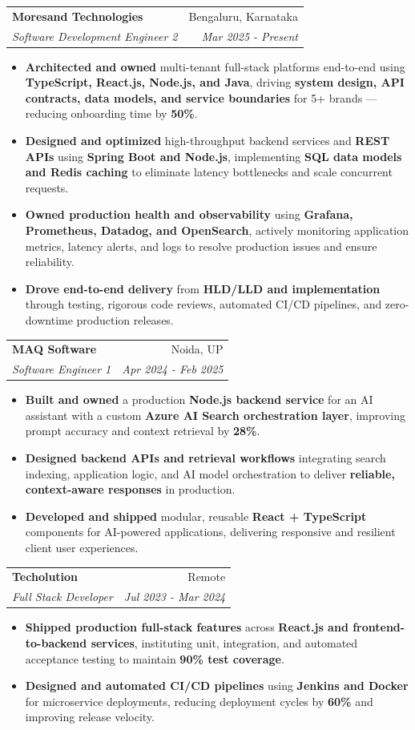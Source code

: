 \documentclass[a4paper,10pt]{article}
\makeatletter
\newcommand{\resumeSubheading}[4]{
  \vspace{-1pt}\item
    \begin{tabular*}{0.97\textwidth}{l@{\extracolsep{\fill}}r}
      \textbf{#1} & #2 \\
      \textit{#3} & \textit{#4} \\
    \end{tabular*}\vspace{-5pt}
}
\newcommand{\resumeItemListStart}{\begin{itemize}}
\newcommand{\resumeItemListEnd}{\end{itemize}\vspace{-5pt}}
\makeatother
\begin{document}
    \resumeSubheading{Moresand Technologies}{Bengaluru, Karnataka}
      {Software Development Engineer 2}{Mar 2025 - Present}
      \resumeItemListStart
        \item \textnormal{\textbf{Architected and owned} multi-tenant full-stack platforms end-to-end using \textbf{TypeScript, React.js, Node.js, and Java}, driving \textbf{system design, API contracts, data models, and service boundaries} for 5+ brands — reducing onboarding time by \textbf{50\%}.}
        \item \textnormal{\textbf{Designed and optimized} high-throughput backend services and \textbf{REST APIs} using \textbf{Spring Boot and Node.js}, implementing \textbf{SQL data models and Redis caching} to eliminate latency bottlenecks and scale concurrent requests.}
        \item \textnormal{\textbf{Owned production health and observability} using \textbf{Grafana, Prometheus, Datadog, and OpenSearch}, actively monitoring application metrics, latency alerts, and logs to resolve production issues and ensure reliability.}
        \item \textnormal{\textbf{Drove end-to-end delivery} from \textbf{HLD/LLD and implementation} through testing, rigorous code reviews, automated CI/CD pipelines, and zero-downtime production releases.}
      \resumeItemListEnd

    \resumeSubheading{MAQ Software}{Noida, UP}
      {Software Engineer 1}{Apr 2024 - Feb 2025}
      \resumeItemListStart
        \item \textnormal{\textbf{Built and owned} a production \textbf{Node.js backend service} for an AI assistant with a custom \textbf{Azure AI Search orchestration layer}, improving prompt accuracy and context retrieval by \textbf{28\%}.}
        \item \textnormal{\textbf{Designed backend APIs and retrieval workflows} integrating search indexing, application logic, and AI model orchestration to deliver \textbf{reliable, context-aware responses} in production.}
        \item \textnormal{\textbf{Developed and shipped} modular, reusable \textbf{React + TypeScript} components for AI-powered applications, delivering responsive and resilient client user experiences.}
      \resumeItemListEnd

    \resumeSubheading{Techolution}{Remote}
      {Full Stack Developer}{Jul 2023 - Mar 2024}
      \resumeItemListStart
        \item \textnormal{\textbf{Shipped production full-stack features} across \textbf{React.js and frontend-to-backend services}, instituting unit, integration, and automated acceptance testing to maintain \textbf{90\% test coverage}.}
        \item \textnormal{\textbf{Designed and automated CI/CD pipelines} using \textbf{Jenkins and Docker} for microservice deployments, reducing deployment cycles by \textbf{60\%} and improving release velocity.}
      \resumeItemListEnd
\end{document}
